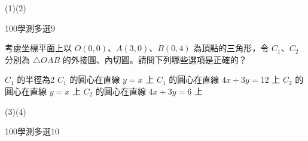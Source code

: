 \begin{QUESTIONS}
\begin{QUESTION}
\begin{QFROMS}
        \end{QFROMS}
        \begin{QTAGS}\end{QTAGS}
        \begin{QANS}
            (1)(2)
        \end{QANS}
        \begin{QSOLLIST}
        \end{QSOLLIST}
        \begin{QEMPTYSPACE}
        \end{QEMPTYSPACE}
    \end{QUESTION}
    \begin{QUESTION}
        \begin{ExamInfo}{100}{學測}{多選}{9}
        \end{ExamInfo}
        \begin{ExamAnsRateInfo}{61}{90}{62}{31}
        \end{ExamAnsRateInfo}
        \begin{QBODY}
            考慮坐標平面上以 $O(0,0)$、$A(3,0)$、$B(0,4)$ 為頂點的三角形，令 $C_1$、$C_2$ 分別為 $\triangle OAB$ 的外接圓、內切圓。請問下列哪些選項是正確的？
			\begin{QOPS}
				\QOP $C_1$ 的半徑為2 
				\QOP $C_1$ 的圓心在直線 $y=x$ 上 
				\QOP $C_1$ 的圓心在直線 $4x+3y=12$ 上    
				\QOP $C_2$ 的圓心在直線 $y=x$ 上 \quad 
				\QOP $C_2$ 的圓心在直線 $4x+3y=6$ 上
			\end{QOPS}
        \end{QBODY}
        \begin{QFROMS}
        \end{QFROMS}
        \begin{QTAGS}\end{QTAGS}
        \begin{QANS}
            (3)(4)
        \end{QANS}
        \begin{QSOLLIST}
        \end{QSOLLIST}
        \begin{QEMPTYSPACE}
        \end{QEMPTYSPACE}
    \end{QUESTION}
    \begin{QUESTION}
        \begin{ExamInfo}{100}{學測}{多選}{10}
        \end{ExamInfo}
        \begin{ExamAnsRateInfo}{37}{64}{33}{14}

\end{ExamAnsRateInfo}
\end{QUESTION}
\end{QUESTIONS}
